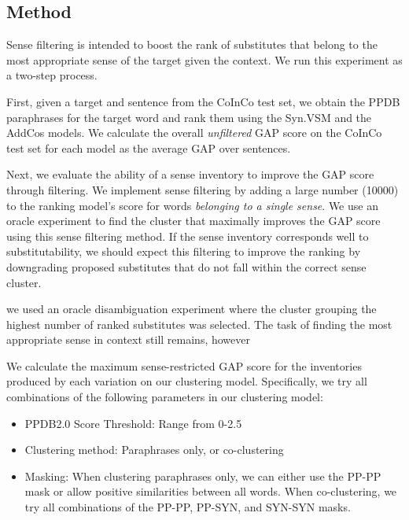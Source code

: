 \documentclass[11pt]{article}
\begin{document}
\subsection{Method}

Sense filtering is intended to boost the  rank of substitutes that belong to the most appropriate sense of the target given the context. We run this experiment as a two-step process.

First, given a target and sentence from the CoInCo test set, we obtain the PPDB paraphrases for the target word and rank them using the Syn.VSM and the AddCos models. We calculate the overall \textit{unfiltered} GAP score on the CoInCo test set for each model as the average GAP over sentences.

Next, we evaluate the ability of a sense inventory to improve the GAP score through filtering. We implement sense filtering by adding a large number (10000) to the ranking model's score for words \textit{belonging to a single sense}. We use an oracle experiment to find the cluster that maximally improves the GAP score using this sense filtering method. 
If the sense inventory corresponds well to substitutability, we should expect this filtering to improve the ranking by downgrading proposed substitutes that do not fall within the correct sense cluster.

we used an oracle disambiguation experiment where the cluster grouping the highest number of ranked substitutes was selected. The task of finding the most appropriate sense in context still remains, however 


We calculate the maximum sense-restricted GAP score for the inventories produced by each variation on our clustering model. Specifically, we try all combinations of the following parameters in our clustering model:

\begin{itemize}
	\item PPDB2.0 Score Threshold: Range from 0-2.5
	\item Clustering method: Paraphrases only, or co-clustering
	\item Masking: When clustering paraphrases only, we can either use the PP-PP mask or allow positive similarities between all words. When co-clustering, we try all combinations of the PP-PP, PP-SYN, and SYN-SYN masks.
\end{itemize}
\end{document}

